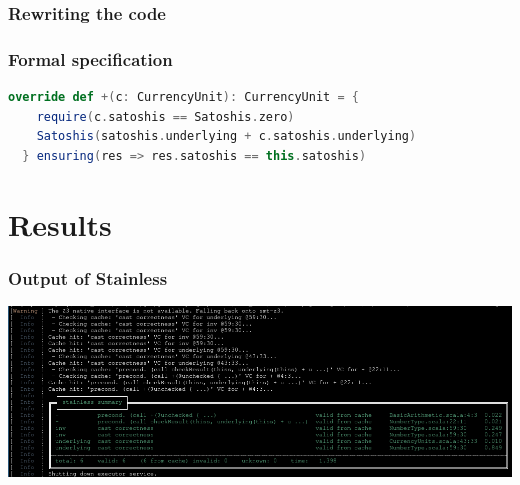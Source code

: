 \documentclass{beamer}
\begin{document}
\begin{frame}
\frametitle{Rewriting the code}
\end{frame}


\begin{frame}[fragile]
\frametitle{Formal specification}
\begin{lstlisting}[language=Scala]
  override def +(c: CurrencyUnit): CurrencyUnit = {
    require(c.satoshis == Satoshis.zero)
    Satoshis(satoshis.underlying + c.satoshis.underlying)
  } ensuring(res => res.satoshis == this.satoshis)
\end{lstlisting}
\end{frame}


\section{Results}

\begin{frame}
\frametitle{Output of Stainless}
\centering
\includegraphics[width=\textwidth,height=0.8\textheight,keepaspectratio]{assets/final_verify_output.png}
\end{frame}
\end{document}
